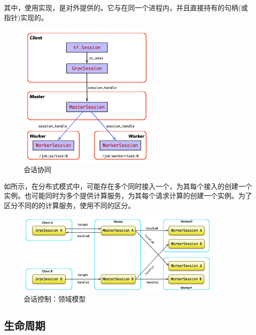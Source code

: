 \begin{content}
\begin{content}
\begin{content}
其中，使用实现，是\tf{}对外提供的。它与在同一个进程内，并且直接持有的句柄(或指针)实现的。

\begin{figure}[H]
\centering
\includegraphics[width=0.6\textwidth]{figures/dist-session-overview-1.png}
\caption{会话协同}
 \label{fig:dist-session-overview}
\end{figure}

如所示，在分布式模式中，可能存在多个同时接入一个，为其每个接入的创建一个实例。也可能同时为多个提供计算服务，为其每个请求计算的创建一个实例。为了区分不同的的计算服务，使用不同的区分。

\begin{figure}[H]
\centering
\includegraphics[width=0.9\textwidth]{figures/dist-multi-client-conn.png}
\caption{会话控制：领域模型}
 \label{fig:dist-multi-client-conn}
\end{figure}

\subsection{生命周期}


\end{content}
\end{content}
\end{content}
